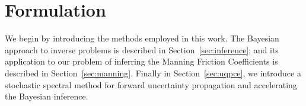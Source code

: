 \section{Formulation}
\label{sec:formu}
We begin by introducing the methods employed in this work.
The Bayesian approach to inverse problems is described in Section~\ref{sec:inference};
and its application to our problem of inferring the Manning Friction Coefficients is described in Section~\ref{sec:manning}. Finally in Section~\ref{sec:uqpce}, we introduce
a stochastic spectral method for forward uncertainty propagation and accelerating the Bayesian inference.





